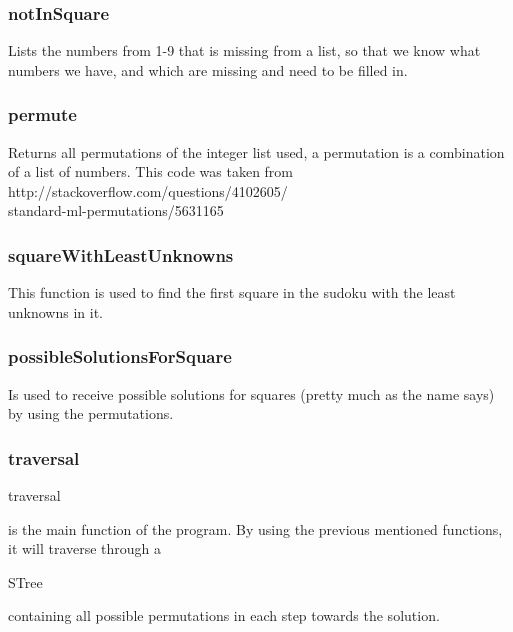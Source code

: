 \documentclass[12pt, a4paper]{article}
\begin{document}
\begin{adjustwidth}{2em}{0pt}
\begin{adjustwidth}{3em}{0pt}
				\subsubsection{notInSquare}
					\begin{adjustwidth}{3em}{0pt}
						Lists the numbers from 1-9 that is missing from a list, so that we know what numbers we have, and which are missing and need to be filled in.
					\end{adjustwidth}
				\subsubsection{permute}
					\begin{adjustwidth}{3em}{0pt}
						Returns all permutations of the integer list used, a permutation is a combination of a list of numbers. This code was taken from \\ http://stackoverflow.com/questions/4102605/ \\standard-ml-permutations/5631165
					\end{adjustwidth}
				\subsubsection{squareWithLeastUnknowns}
					\begin{adjustwidth}{3em}{0pt}
						This function is used to find the first square in the sudoku with the least unknowns in it.

					\end{adjustwidth}
				\subsubsection{possibleSolutionsForSquare}
					\begin{adjustwidth}{3em}{0pt}
						Is used to receive possible solutions for squares (pretty much as the name says) by using the permutations. 
					\end{adjustwidth}
				\subsubsection{traversal}
					\begin{adjustwidth}{3em}{0pt}
						\begin{ttfamily}traversal\end{ttfamily} is the main function of the program. By using the previous mentioned functions, it will traverse through a \begin{ttfamily}STree\end{ttfamily}  containing all possible permutations in each step towards the solution.
					\end{adjustwidth}
			\end{adjustwidth}

\end{adjustwidth}
\end{document}
